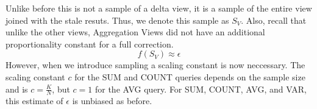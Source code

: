 Unlike before this is not a sample of a delta view, it is a sample of the entire view joined with the stale resuts.
Thus, we denote this sample as $S_{V}$.
Also, recall that unlike the other views, Aggregation Views did not have 
an additional proportionality constant for a full correction.
\[
f(S_{V})\approx\epsilon
\]
However, when we introduce sampling a scaling constant is now neccessary.
The scaling constant $c$ for the SUM and COUNT queries depends on the sample size and is $c = \frac{K}{N}$, 
but $c = 1$ for the AVG query.
For SUM, COUNT, AVG, and VAR, this estimate of $\epsilon$ is unbiased as before.
\fi


